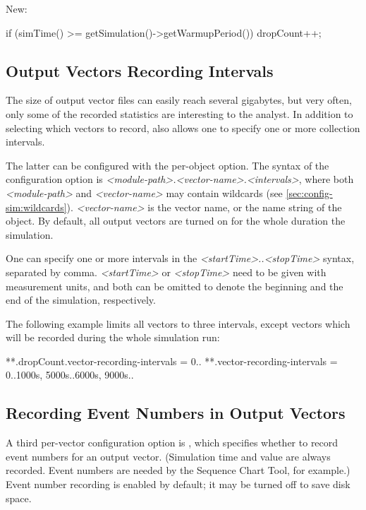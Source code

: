 New:

\begin{cpp}
if (simTime() >= getSimulation()->getWarmupPeriod())
    dropCount++;
\end{cpp}


\subsection{Output Vectors Recording Intervals}
\label{sec:ana-sim:vector-recording-intervals}

The size of output vector files can easily reach several gigabytes,
but very often, only some of the recorded statistics are
interesting to the analyst. In addition to selecting which vectors to
record, {\opp} also allows one to specify one or more collection intervals.

The latter can be configured with the 
per-object option. The syntax of the configuration option is
\textit{<module-path>.<vector-name>.}\textit{<intervals>},
where both \textit{<module-path>} and \textit{<vector-name>} may
contain wildcards (see \ref{sec:config-sim:wildcards}).
\textit{<vector-name>} is the vector name, or the name string of the
 object. By default, all output vectors are turned
on for the whole duration the simulation.

One can specify one or more intervals in the \textit{<startTime>..<stopTime>}
syntax, separated by comma. \textit{<startTime>} or \textit{<stopTime>} need
to be given with measurement units, and both can be omitted to denote
the beginning and the end of the simulation, respectively.

The following example limits all vectors to three intervals, except
 vectors which will be recorded during the whole
simulation run:

\begin{inifile}
**.dropCount.vector-recording-intervals = 0..
**.vector-recording-intervals = 0..1000s, 5000s..6000s, 9000s..
\end{inifile}

\subsection{Recording Event Numbers in Output Vectors}
\label{sec:ana-sim:vector-eventnum-recording}

A third per-vector configuration option is ,
which specifies whether to record event numbers for an output vector.
(Simulation time and value are always recorded. Event numbers are needed
by the Sequence Chart Tool, for example.) Event number recording is enabled
by default; it may be turned off to save disk space.

